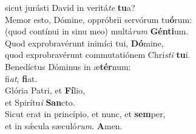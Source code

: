 \evenverse sicut jurásti David in veritá\textit{te} \textbf{tu}a?\\
\oddverse Memor esto, Dómine, oppróbrii servórum tu\textbf{ó}rum:~\*\\
\oddverse (quod contínui in sinu meo) multá\textit{rum} \textbf{Gén}\textbf{ti}um.\\
\evenverse Quod exprobravérunt inimíci tui, \textbf{Dó}mine,~\*\\
\evenverse quod exprobravérunt commutatiónem Chri\textit{sti} \textbf{tu}i.\\
\oddverse Benedíctus Dóminus in æ\textbf{tér}num:~\*\\
\oddverse fi\textit{at}, \textbf{fi}at.\\
\evenverse Glória Patri, et \textbf{Fí}lio,~\*\\
\evenverse et Spirítu\textit{i} \textbf{San}cto.\\
\oddverse Sicut erat in princípio, et nunc, et \textbf{sem}per,~\*\\
\oddverse et in sǽcula sæculó\textit{rum}. \textbf{A}men.\\
